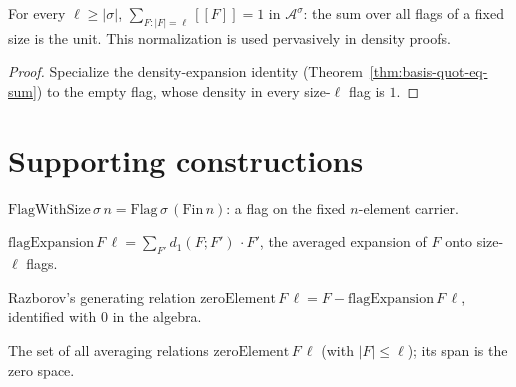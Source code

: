 \begin{theorem}
  \label{thm:sum-flags-eq-one}
  \leanok
  For every $\ell \ge |\sigma|$, $\sum_{F : |F|=\ell} [\![F]\!] = 1$ in
  $\mathcal{A}^\sigma$: the sum over all flags of a fixed size is the unit. This
  normalization is used pervasively in density proofs.
\end{theorem}
\begin{proof}\leanok
  Specialize the density-expansion identity
  (Theorem~\ref{thm:basis-quot-eq-sum}) to the empty flag, whose density in every
  size-$\ell$ flag is $1$.
\end{proof}

\section{Supporting constructions}

\begin{definition}
  \label{def:flag-with-size}
  \leanok
  $\mathrm{FlagWithSize}\,\sigma\,n = \mathrm{Flag}\,\sigma\,(\mathrm{Fin}\,n)$:
  a flag on the fixed $n$-element carrier.
\end{definition}

\begin{definition}
  \label{def:flag-expansion}
  \leanok
  $\mathrm{flagExpansion}\,F\,\ell = \sum_{F'} d_1(F;F')\,\cdot F'$, the averaged
  expansion of $F$ onto size-$\ell$ flags.
\end{definition}

\begin{definition}
  \label{def:zero-element}
  \leanok
  Razborov's generating relation
  $\mathrm{zeroElement}\,F\,\ell = F - \mathrm{flagExpansion}\,F\,\ell$,
  identified with $0$ in the algebra.
\end{definition}

\begin{definition}
  \label{def:zero-set}
  \leanok
  The set of all averaging relations $\mathrm{zeroElement}\,F\,\ell$ (with
  $|F| \le \ell$); its span is the zero space.
\end{definition}

